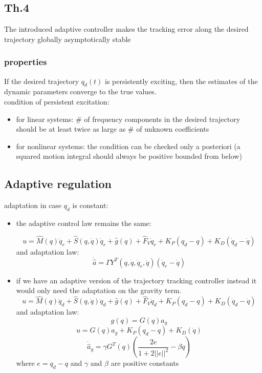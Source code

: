 \documentclass[a4paper,12pt]{article}
\begin{document}
\subsection{Th.4}
The introduced adaptive controller makes the tracking error along
the desired trajectory globally asymptotically stable
\subsubsection{properties}
If the desired trajectory $q_d(t)$ is persistently exciting, then
the estimates of the dynamic parameters converge to the true values.\\
condition of persistent excitation:
\begin{itemize}
\item for linear systems: \# of frequency components in the desired trajectory
should be at least twice as large as \# of unknown coefficients
\item for nonlinear systems: the condition can be checked only a posteriori
(a squared motion integral should always be positive bounded from below)
\end{itemize}
\subsection{Adaptive regulation}\label{sec:Adaptive regulation}
adaptation in case $q_d$ is constant:\begin{itemize}
\item the adaptive control law remains the same:

\begin{equation}
    u = \hat{M}(q)\ddot{q}_r + \hat{S}(q,\dot{q})\dot{q}_r + \hat{g}(q) + \hat{F}_V\dot{q}_r + K_P(q_d-q) + K_D(\dot{q}_d-\dot{q})
\end{equation}
and adaptation law:
\begin{equation}
\dot{\hat{a}} = \Gamma Y^T (q,\dot{q},\dot{q}_r,\ddot{q})(\dot{q}_r-\dot{q})
\end{equation}
\item if we have an adaptive version of the trajectory tracking 
controller instead it would only need the adaptation on 
the gravity term.
\begin{equation}
    u = \hat{M}(q)\ddot{q}_d + \hat{S}(q,\dot{q})\dot{q}_d + \hat{g}(q) + \hat{F}_V\dot{q}_d + K_P(q_d-q) + K_D(\dot{q}_d-\dot{q})
\end{equation}
and adaptation law:
\begin{equation}
    g(q) = G(q)a_g
\end{equation}
\begin{equation}\label{eq:adaptive regulation gravity}
    u = G(q)\hat{a}_g + K_P(q_d-q) + K_D(\dot{q})
\end{equation}
\begin{equation}
\dot{\hat{a}}_g= \gamma G^T(q)(\frac{2e}{1+2||e||^2}-\beta \dot{q})
\end{equation}
where $e = q_d - q$ and $\gamma$ and $\beta$ are positive constants
\end{itemize}
\end{document}
